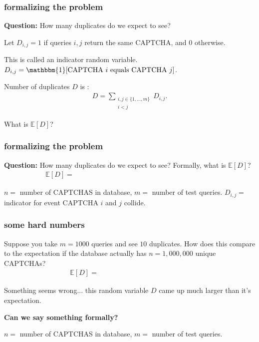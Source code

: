 \documentclass[]{beamer}
\newcommand{\E}{\mathbb{E}}
\begin{document}
	\begin{frame}
		\frametitle{formalizing the problem}
		\textbf{Question:} How many duplicates do we expect to see?
		
		Let $D_{i,j} = 1$ if queries $i,j$ return the same CAPTCHA, and $0$ otherwise. 
		
		This is called an \alert{indicator random variable}. $D_{i,j} = \mathbbm{1}[\text{CAPTCHA $i$ equals CAPTCHA $j$}]$.
		
		Number of duplicates $D$ is :
		\begin{align*}
			D = \sum_{\substack{i,j \in \{1,\ldots, m\}\\ i < j}} D_{i,j}.
		\end{align*}
		
		\begin{center}
			\Large What is $\E[D]$?
		\end{center}
	\end{frame}
	\begin{frame}
		\frametitle{formalizing the problem}
		\textbf{Question:} How many duplicates do we expect to see? Formally, what is $\E[D]$?
		\begin{align*}
			\E[D] = \hspace{20em}
		\end{align*}
		
		\vspace{9em}
		\begin{block}{\vspace*{-3ex}}
			\small $n = $ number of CAPTCHAS in database, $m=$ number of test queries. $D_{i,j} =$ indicator for event CAPTCHA $i$ and $j$ collide. 
		\end{block}
	\end{frame}
	
	\begin{frame}
		\frametitle{some hard numbers}
		Suppose you take $m = 1000$ queries and see $10$ duplicates. How does this compare to the expectation if the database actually has $n = 1,000,000$ unique CAPTCHAs?
		\vspace{1em}
		\begin{align*}
			\E[D] = \hspace{13em} 
		\end{align*}

			
		Something seems wrong... this random variable $D$ came up much larger than it's expectation. 
		
		\begin{center}
			\alert{\textbf{Can we say something formally?}}
		\end{center}
		
		\vspace{4em}
		\begin{block}{\vspace*{-3ex}}
			\small $n = $ number of CAPTCHAS in database, $m=$ number of test queries.
		\end{block}
	\end{frame}
	
\end{document}
